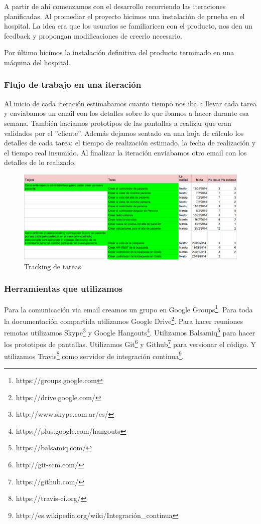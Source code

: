 A partir de ahí comenzamos con el desarrollo recorriendo las iteraciones planificadas. Al promediar el proyecto hicimos una instalación de prueba en el hospital. La idea era que los usuarios se familiaricen con el producto, nos den un feedback y propongan modificaciones de creerlo necesario.

Por último hicimos la instalación definitiva del producto terminado en una máquina del hospital.

\subsubsection{Flujo de trabajo en una iteración}
Al inicio de cada iteración estimabamos cuanto tiempo nos iba a llevar cada tarea y enviabamos un email con los detalles sobre lo que ibamos a hacer durante esa semana. También haciamos prototipos de las pantallas a realizar que eran validados por el ''cliente''. Además dejamos sentado en una hoja de cálculo los detalles de cada tarea: el tiempo de realización estimado, la fecha de realización y el tiempo real insumido. Al finalizar la iteración enviabamos otro email con los detalles de lo realizado.

\begin{figure}[h]
  \centerline{\includegraphics[width=1.2\textwidth]{tracking.png}}
  \caption{Tracking de tareas}
\end{figure}

\subsubsection{Herramientas que utilizamos}
Para la comunicación via email creamos un grupo en Google Groups\footnote{https://groups.google.com}.
Para toda la documentación compartida utilizamos Google Drive\footnote{https://drive.google.com/}. Para hacer reuniones remotas utilizamos Skype\footnote{http://www.skype.com.ar/es/} y Google Hangouts\footnote{https://plus.google.com/hangouts}. Utilizamos Balsamiq\footnote{https://balsamiq.com/} para hacer los prototipos de pantallas. Utilizamos Git\footnote{http://git-scm.com/} y Github\footnote{https://github.com/} para versionar el código. Y utilizamos Travis\footnote{https://travis-ci.org/} como servidor de integración continua\footnote{http://es.wikipedia.org/wiki/Integración\_continua}.

